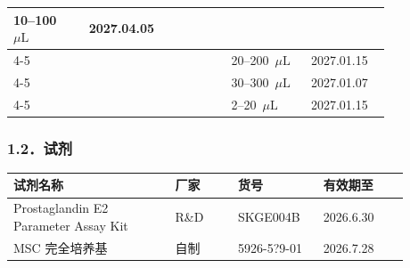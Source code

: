 \documentclass[UTF8,10pt,a4paper,fontset=fandol]{ctexart}
\newcommand{\fieldvalue}[1]{#1}
\newcommand{\handwritten}[1]{#1}
\begin{document}
\begin{center}
\begin{tabular}{|p{0.18\linewidth}|p{0.14\linewidth}|p{0.14\linewidth}|p{0.19\linewidth}|p{0.19\linewidth}|}
\fieldvalue{\handwritten{10--100~\(\mu\mathrm{L}\)}} &
\fieldvalue{\handwritten{2027.04.05}} \\
\cline{4-5}
& & &
\fieldvalue{\handwritten{20--200~\(\mu\mathrm{L}\)}} &
\fieldvalue{\handwritten{2027.01.15}} \\
\cline{4-5}
& & &
\fieldvalue{\handwritten{30--300~\(\mu\mathrm{L}\)}} &
\fieldvalue{\handwritten{2027.01.07}} \\
\cline{4-5}
& & &
\fieldvalue{\handwritten{2--20~\(\mu\mathrm{L}\)}} &
\fieldvalue{\handwritten{2027.01.15}} \\
\hline
\end{tabular}
\end{center}

\subsubsection{1.2．试剂}

\begin{center}
\small
\begin{tabular}{|p{0.36\linewidth}|p{0.14\linewidth}|p{0.19\linewidth}|p{0.19\linewidth}|}
\hline
试剂名称 & 厂家 & 货号 & 有效期至 \\
\hline
Prostaglandin E2 Parameter Assay Kit &
R\&D &
\fieldvalue{\handwritten{SKGE004B}} &
\fieldvalue{\handwritten{2026.6.30}} \\
\hline
MSC 完全培养基 &
自制 &
\fieldvalue{\handwritten{5926-5?9-01}} &
\fieldvalue{\handwritten{2026.7.28}} \\
\hline
\end{tabular}
\end{center}
\end{document}
